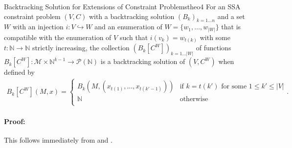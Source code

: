 \begin{theorem}{Backtracking Solution for Extensions of Constraint Problems}{theo4}
    For an SSA constraint problem $(V,C)$ with a backtracking
    solution $(B_k)_{k=1\dots n}$ and a set $W$ with an injection
    $i:V\hookrightarrow W$ and an enumeration of $W=\{w_1,\dots,w_{|W|}\}$ that
    is compatible with the enumeration of $V$ such that $i(v_k)=w_{t(k)}$ with
    some $t:\mathbb N\rightarrow\mathbb N$ strictly increasing, the collection
    $(B_k[C^W])_{k=1\dots |W|}$ of functions
    $B_k[C^W]\colon\mathcal M\times\mathbb N^{k-1}\rightarrow\mathcal P(\mathbb N)$
    is a backtracking solution of $(V,C^W)$ when defined by
    \begin{align*}
        B_k[C^W](M,x)=\left\{
            \begin{array}{ll}
                B_k\left(M,\left(x_{t(1)},\dots,x_{t(k'-1)}\right)\right)&\text{if }k=t(k')\text{ for some }1\leq k'\leq|V|\\
                \mathbb N&\text{otherwise}\\
            \end{array}\right..
    \end{align*}
    \tcblower
    \paragraph*{Proof:}
    This follows immediately from  and .
\end{theorem}
